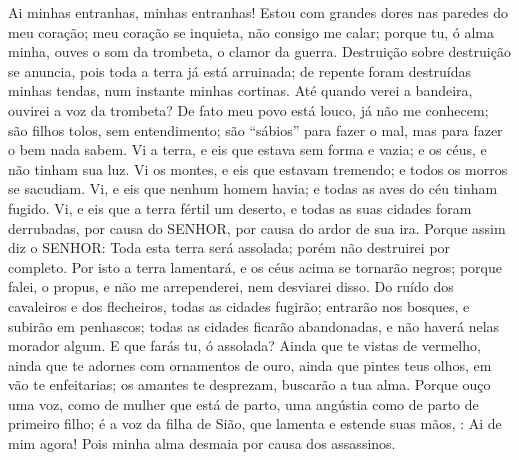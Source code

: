 {Ai minhas entranhas, minhas entranhas! Estou com grandes dores nas paredes do meu coração; meu coração se inquieta, não consigo me calar; porque tu, ó alma minha, ouves o som da trombeta, o clamor da guerra.
Destruição sobre destruição se anuncia, pois toda a terra já está arruinada; de repente foram destruídas minhas tendas, num instante minhas cortinas.
Até quando verei a bandeira,
{} ouvirei a voz da trombeta?
De fato meu povo está louco, já não me conhecem; são filhos tolos, sem entendimento; são “sábios” para fazer o mal, mas para fazer o bem nada sabem.
Vi a terra, e eis que estava sem forma e vazia; e
{} os céus, e não tinham sua luz.
Vi os montes, e eis que estavam tremendo; e todos os morros se sacudiam.
Vi, e eis que nenhum homem havia; e todas as aves do céu tinham fugido.
Vi, e eis que a terra fértil
{} um deserto, e todas as suas cidades foram derrubadas, por causa do
 SENHOR, por causa do ardor de sua ira.
Porque assim diz o SENHOR: Toda esta terra será assolada; porém não
{} destruirei por completo.
Por isto a terra lamentará, e os céus acima se tornarão negros; porque
{} falei,
{} o propus, e não me arrependerei, nem desviarei disso.
Do ruído dos cavaleiros e dos flecheiros,
{} todas as cidades fugirão; entrarão nos bosques, e subirão em penhascos; todas as cidades ficarão abandonadas, e não haverá nelas morador algum.
E que farás tu, ó assolada? Ainda que te vistas de vermelho, ainda que te adornes com ornamentos de ouro, ainda que pintes teus olhos, em vão te enfeitarias; os
{} amantes te desprezam,
{} buscarão
{} a tua alma.
Porque ouço uma voz, como de mulher que está de parto, uma angústia como de parto de primeiro filho; é a voz da filha de Sião, que lamenta e estende suas mãos,
{} : Ai de mim agora! Pois minha alma desmaia por causa dos assassinos.

\par }

